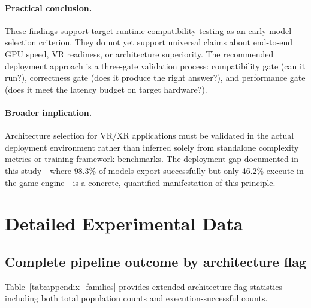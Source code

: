 \documentclass[10pt,twocolumn]{article}
\begin{document}
\paragraph{Practical conclusion.}
These findings support target-runtime compatibility testing as an early model-selection criterion. They do not yet support universal claims about end-to-end GPU speed, VR readiness, or architecture superiority. The recommended deployment approach is a three-gate validation process: compatibility gate (can it run?), correctness gate (does it produce the right answer?), and performance gate (does it meet the latency budget on target hardware?).

\paragraph{Broader implication.}
Architecture selection for VR/XR applications must be validated in the actual deployment environment rather than inferred solely from standalone complexity metrics or training-framework benchmarks. The deployment gap documented in this study---where 98.3\% of models export successfully but only 46.2\% execute in the game engine---is a concrete, quantified manifestation of this principle.

{\small


}

\appendix

\section{Detailed Experimental Data}\label{sec:appendix}

\subsection{Complete pipeline outcome by architecture flag}

Table~\ref{tab:appendix_families} provides extended architecture-flag statistics including both total population counts and execution-successful counts.
\end{document}
